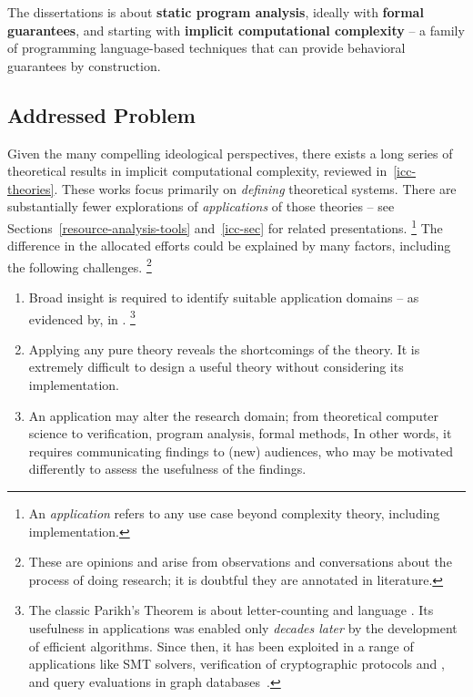 \begin{infobox}
The dissertations is about \textbf{static program analysis}, ideally with
\textbf{formal guarantees}, and starting with \textbf{implicit computational
complexity} -- a family of programming language-based techniques that can
provide behavioral guarantees by construction.
\end{infobox}

\subsection{Addressed Problem}
\label{subsec:problem}

Given the many compelling ideological perspectives, there exists a long series of theoretical results in implicit computational complexity, reviewed in~\autoref{icc-theories}.
These works focus primarily on \emph{defining} theoretical systems.
There are substantially fewer explorations of \emph{applications} of those theories -- see Sections~\ref{resource-analysis-tools} and~\ref{icc-sec} for related presentations.%
\footnote{An \emph{application} refers to any use case beyond complexity theory, including implementation.}
The difference in the allocated efforts could be explained by many factors, including the following challenges.%
\footnote{These are opinions and arise from observations and conversations about the process of doing research; it is doubtful they are annotated in literature.}

\begin{enumerate}

\item Broad insight is required to identify suitable application domains -- as
      evidenced by, \eg {} in .%
      \footnote{The classic Parikh's Theorem is about letter-counting and language .
      Its usefulness in applications was enabled only \emph{decades later} by the development of efficient algorithms.
      Since then,  it has been exploited in a range of applications like SMT solvers, verification of cryptographic protocols and , and query evaluations in graph databases~\cite[pg. 2]{hague2024}.}

\item Applying any pure theory reveals the shortcomings of the theory.
      It is extremely difficult to design a useful theory without considering its implementation.

\item An application may alter the research domain; \eg from theoretical computer science to verification, program analysis, formal methods, \etc
      In other words, it requires communicating findings to (new) audiences, who may be motivated differently to assess the usefulness of the findings.

\end{enumerate}

